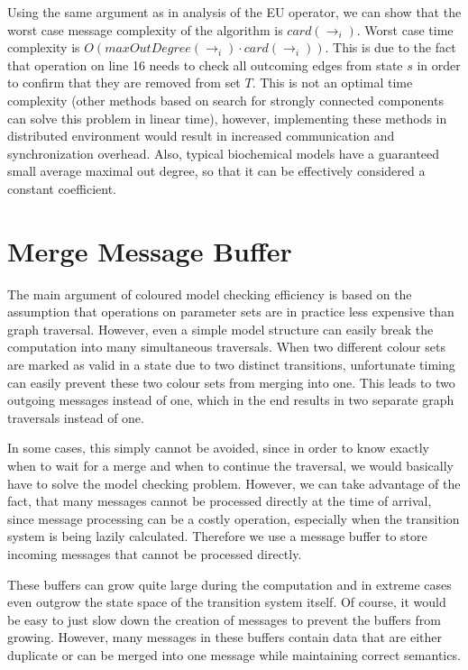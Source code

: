 \documentclass[12pt,oneside]{fithesis2}
\newcommand{\trans}[1]{\stackrel{#1}{\rightarrow}}
\begin{document}
				Using the same argument as in analysis of the EU operator, we can show that the worst case message complexity of the algorithm is $card(\trans{}_{i})$. Worst case time complexity is $O(maxOutDegree(\trans{}_{i}) \cdot card(\trans{}_{i}))$. This is due to the fact that operation on line 16 needs to check all outcoming edges from state $s$ in order to confirm that they are removed from set $T$. This is not an optimal time complexity (other methods based on search for strongly connected components can solve this problem in linear time), however, implementing these methods in distributed environment would result in increased communication and synchronization overhead. Also, typical biochemical models have a guaranteed small average maximal out degree, so that it can be effectively considered a constant coefficient.
								
		\section{Merge Message Buffer}
			\label{sec:merge}

			The main argument of coloured model checking efficiency is based on the assumption that operations on parameter sets are in practice less expensive than graph traversal. However, even a simple model structure can easily break the computation into many simultaneous traversals. When two different colour sets are marked as valid in a state due to two distinct transitions, unfortunate timing can easily prevent these two colour sets from merging into one. This leads to two outgoing messages instead of one, which in the end results in two separate graph traversals instead of one. 
			
			In some cases, this simply cannot be avoided, since in order to know exactly when to wait for a merge and when to continue the traversal, we would basically have to solve the model checking problem. However, we can take advantage of the fact, that many messages cannot be processed directly at the time of arrival, since message processing can be a costly operation, especially when the transition system is being lazily calculated. Therefore we use a message buffer to store incoming messages that cannot be processed directly.
			
			These buffers can grow quite large during the computation and in extreme cases even outgrow the state space of the transition system itself. Of course, it would be easy to just slow down the creation of messages to prevent the buffers from growing. However, many messages in these buffers contain data that are either duplicate or can be merged into one message while maintaining correct semantics.
			
\end{document}

